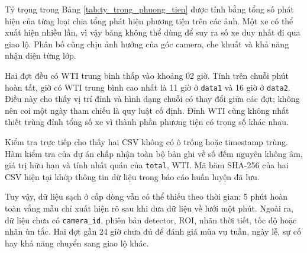     Tỷ trọng trong Bảng \ref{tab:ty_trong_phuong_tien} được tính bằng tổng số phát hiện của từng loại chia tổng phát hiện phương tiện trên các ảnh. Một xe có thể xuất hiện nhiều lần, vì vậy bảng không thể dùng để suy ra số xe duy nhất đi qua giao lộ. Phân bố cũng chịu ảnh hưởng của góc camera, che khuất và khả năng nhận diện từng lớp.

    

    Hai đợt đều có WTI trung bình thấp vào khoảng 02 giờ. Tính trên chuỗi phút hoàn tất, giờ có WTI trung bình cao nhất là 11 giờ ở \texttt{data1} và 16 giờ ở \texttt{data2}. Điều này cho thấy vị trí đỉnh và hình dạng chuỗi có thay đổi giữa các đợt; không nên coi một ngày tham chiếu là quy luật cố định. Đỉnh WTI cũng không nhất thiết trùng đỉnh tổng số xe vì thành phần phương tiện có trọng số khác nhau.

    

    Kiểm tra trực tiếp cho thấy hai CSV không có ô trống hoặc timestamp trùng. Hàm kiểm tra của dự án chấp nhận toàn bộ bản ghi về số đếm nguyên không âm, giá trị hữu hạn và tính nhất quán của \texttt{total}, WTI. Mã băm SHA-256 của hai CSV hiện tại khớp thông tin dữ liệu trong báo cáo huấn luyện đã lưu.

    Tuy vậy, dữ liệu sạch ở cấp dòng vẫn có thể thiếu theo thời gian: 5 phút hoàn toàn vắng mẫu chỉ xuất hiện rõ sau khi đưa dữ liệu về lưới một phút. Ngoài ra, dữ liệu chưa có \texttt{camera\_id}, phiên bản detector, ROI, nhãn thời tiết, tốc độ hoặc nhãn ùn tắc. Hai đợt gần 24 giờ chưa đủ để đánh giá mùa vụ tuần, ngày lễ, sự cố hay khả năng chuyển sang giao lộ khác.
    
